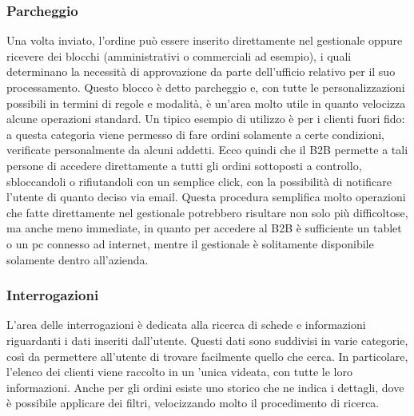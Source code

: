 \subsubsection{Parcheggio}
Una volta inviato, l'ordine può essere inserito direttamente nel gestionale oppure ricevere dei blocchi (amministrativi o commerciali ad esempio), i quali determinano la necessità di approvazione da parte dell'ufficio relativo per il suo processamento. Questo blocco è detto parcheggio e, con tutte le personalizzazioni possibili in termini di regole e modalità, è un'area molto utile in quanto velocizza alcune operazioni standard. Un tipico esempio di utilizzo è per i clienti fuori fido: a questa categoria viene permesso di fare ordini solamente a certe condizioni, verificate personalmente da alcuni addetti. Ecco quindi che il B2B permette a tali persone di accedere direttamente a tutti gli ordini sottoposti a controllo, sbloccandoli o rifiutandoli con un semplice click, con la possibilità di notificare l'utente di quanto deciso via email. Questa procedura semplifica molto operazioni che fatte direttamente nel gestionale potrebbero risultare non solo più difficoltose, ma anche meno immediate, in quanto per accedere al B2B è sufficiente un tablet o un pc connesso ad internet, mentre il gestionale è solitamente disponibile solamente dentro all'azienda.

\subsubsection{Interrogazioni}
L'area delle interrogazioni è dedicata alla ricerca di schede e informazioni riguardanti i dati inseriti dall'utente. Questi dati sono suddivisi in varie categorie, così da permettere all'utente di trovare facilmente quello che cerca. In particolare, l'elenco dei clienti viene raccolto in un 'unica videata, con tutte le loro informazioni. Anche per gli ordini esiste uno storico che ne indica i dettagli, dove è possibile applicare dei filtri, velocizzando molto il procedimento di ricerca.

